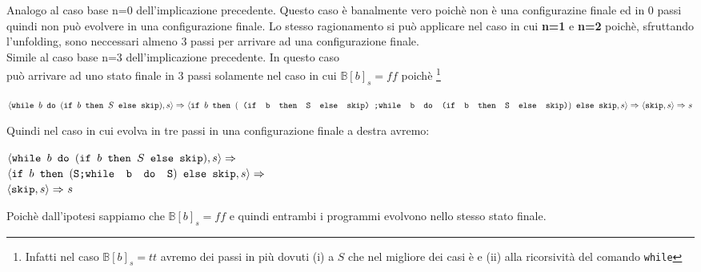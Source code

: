 {	 Analogo al caso base n=0 dell'implicazione precedente. Questo
	caso è banalmente vero poichè \exFourRS{} non è una configurazine finale ed
	in 0 passi quindi non può evolvere in una configurazione finale. Lo stesso
	ragionamento si può applicare nel caso in cui \textbf{n=1} e \textbf{n=2}
	poichè, sfruttando l'unfolding, sono neccessari almeno 3 passi per arrivare
	ad una configurazione finale.\\

	 Simile al caso base n=3 dell'implicazione precedente. In
	questo caso \\ \exFourRS{} può arrivare ad uno stato finale
	in 3 passi solamente nel caso in cui $\mathbb{B}[b]_s=ff$ poichè
	\footnote{Infatti nel caso $\mathbb{B}[b]_s=tt$ avremo dei passi in più 
	dovuti (i) a $S$ che nel migliore dei casi è \skipistr{} e (ii) alla
	ricorsività del comando \texttt{while}}
	\begin{center}
	$\exFourRS\Rar{}
	\confSs{
		\ifABC{b}
			{(\concat{
				(\ifABC{b}{S}{\skipistr})
			}{\wbS{b}{(\ifABC{b}{S}{\skipistr})}{}})}
			{\skipistr}
	}{s}\Rar{}
	\confSs{\skipistr}{s}\Rar{}s$
	\end{center}
	Quindi nel caso in cui \exFourRS{} evolva in tre passi in una
	configurazione finale a destra avremo:
	\begin{center}
	$\confSs{\wbS{b}{(\ifABC{b}{S}{\skipistr})}}{s}\Rar{}$\\
	$\confSs{
		\ifABC{b}{(\concat{S}{\wbS{b}{S}})}{\skipistr}
	}{s}\Rar{}$\\
	$\confSs{\skipistr}{s}\Rar{}s$
	\end{center}
	Poichè dall'ipotesi sappiamo che $\mathbb{B}[b]_s=ff$ e quindi entrambi i programmi evolvono nello stesso stato finale.\\

}

